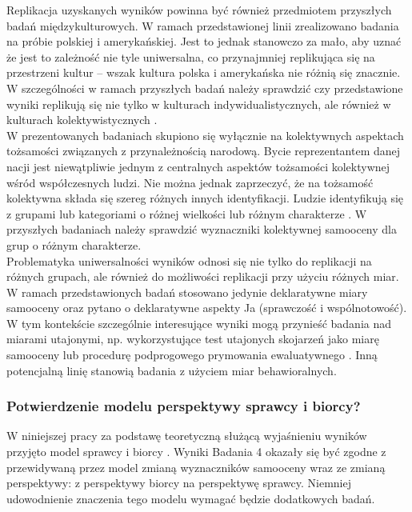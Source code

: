 \documentclass[man]{apa6}
\begin{document}
Replikacja uzyskanych wyników powinna być również przedmiotem przyszłych badań międzykulturowych. W ramach przedstawionej linii zrealizowano badania na próbie polskiej i amerykańskiej. Jest to jednak stanowczo za mało, aby uznać że jest to zależność nie tyle uniwersalna, co przynajmniej replikująca się na przestrzeni kultur -- wszak kultura polska i amerykańska nie różnią się znacznie. W szczególności w ramach przyszłych badań należy sprawdzić czy przedstawione wyniki replikują się nie tylko w kulturach indywidualistycznych, ale również w kulturach kolektywistycznych \parencite[patrz np.,][]{markus1991culture}. \\

W prezentowanych badaniach skupiono się wyłącznie na kolektywnych aspektach tożsamości związanych z przynależnością narodową. Bycie reprezentantem danej nacji jest niewątpliwie jednym z centralnych aspektów tożsamości kolektywnej wśród współczesnych ludzi. Nie można jednak zaprzeczyć, że na tożsamość kolektywna składa się szereg różnych innych identyfikacji. Ludzie identyfikują się z grupami lub kategoriami o różnej wielkości lub różnym charakterze \parencite[patrz np.,][]{lickel2000varieties}. W przyszłych badaniach należy sprawdzić wyznaczniki kolektywnej samooceny dla grup o różnym charakterze.\\

Problematyka uniwersalności wyników odnosi się nie tylko do replikacji na różnych grupach, ale również do możliwości replikacji przy użyciu różnych miar. W ramach przedstawionych badań stosowano jedynie deklaratywne miary samooceny oraz pytano o deklaratywne aspekty Ja (sprawczość i wspólnotowość). W tym kontekście szczególnie interesujące wyniki mogą przynieść badania nad miarami utajonymi, np. wykorzystujące test utajonych skojarzeń jako miarę samooceny \parencite{greenwald2000using} lub procedurę podprogowego prymowania ewaluatywnego \parencite{dijksterhuis2004like}. Inną potencjalną linię stanowią badania z użyciem miar behawioralnych.\\

\subsubsection{Potwierdzenie modelu perspektywy sprawcy i biorcy?}

W niniejszej pracy za podstawę teoretyczną służącą wyjaśnieniu wyników przyjęto model sprawcy i biorcy \parencite{abele2014communal}. Wyniki Badania 4 okazały się być zgodne z przewidywaną przez model zmianą wyznaczników samooceny wraz ze zmianą perspektywy: z perspektywy biorcy na perspektywę sprawcy. Niemniej udowodnienie znaczenia tego modelu wymagać będzie dodatkowych badań.\\
\end{document}

